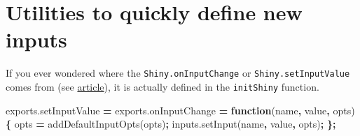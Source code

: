 \documentclass[
]{book}
\newenvironment{Shaded}{\begin{snugshade}}{\end{snugshade}}
\newcommand{\AttributeTok}[1]{\textcolor[rgb]{0.77,0.63,0.00}{#1}}
\newcommand{\ControlFlowTok}[1]{\textcolor[rgb]{0.13,0.29,0.53}{\textbf{#1}}}
\newcommand{\DecValTok}[1]{\textcolor[rgb]{0.00,0.00,0.81}{#1}}
\newcommand{\KeywordTok}[1]{\textcolor[rgb]{0.13,0.29,0.53}{\textbf{#1}}}
\newcommand{\NormalTok}[1]{#1}
\newcommand{\OperatorTok}[1]{\textcolor[rgb]{0.81,0.36,0.00}{\textbf{#1}}}
\newcommand{\StringTok}[1]{\textcolor[rgb]{0.31,0.60,0.02}{#1}}
\newcommand{\VariableTok}[1]{\textcolor[rgb]{0.00,0.00,0.00}{#1}}
\begin{document}
\begin{Shaded}
\end{Shaded}

\hypertarget{utilities-to-quickly-define-new-inputs}{%
\section{Utilities to quickly define new inputs}\label{utilities-to-quickly-define-new-inputs}}

If you ever wondered where the \texttt{Shiny.onInputChange} or \texttt{Shiny.setInputValue} comes from (see \href{https://shiny.rstudio.com/articles/communicating-with-js.html}{article}), it is actually defined in the \texttt{initShiny} function.

\begin{Shaded}
\begin{Highlighting}[]
\VariableTok{exports}\NormalTok{.}\AttributeTok{setInputValue} \OperatorTok{=} \VariableTok{exports}\NormalTok{.}\AttributeTok{onInputChange} \OperatorTok{=} \KeywordTok{function}\NormalTok{(name}\OperatorTok{,}\NormalTok{ value}\OperatorTok{,}\NormalTok{ opts) }\OperatorTok{\{}
\NormalTok{  opts }\OperatorTok{=} \AttributeTok{addDefaultInputOpts}\NormalTok{(opts)}\OperatorTok{;}
  \VariableTok{inputs}\NormalTok{.}\AttributeTok{setInput}\NormalTok{(name}\OperatorTok{,}\NormalTok{ value}\OperatorTok{,}\NormalTok{ opts)}\OperatorTok{;}
\OperatorTok{\};}
\end{Highlighting}
\end{Shaded}
\end{document}
